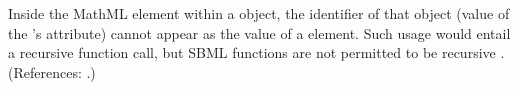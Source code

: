 Inside the  MathML element within a \FunctionDefinition
object, the identifier of that object (\ie value of the
\FunctionDefinition's  attribute) cannot appear as the value of a
 element.  Such usage would entail a recursive function call, but
SBML functions are not permitted to be recursive .  (References: .)
